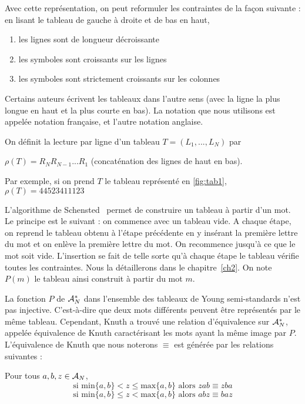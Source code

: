 \vspace*{2em}
Avec cette représentation, on peut reformuler les contraintes de la façon suivante : en lisant le tableau de gauche à droite et de bas en haut,
\vspace*{-1em}
\begin{enumerate}[parsep=0cm, itemsep=0cm]
	\item les lignes sont de longueur décroissante
	\item les symboles sont croissants sur les lignes
	\item les symboles sont strictement croissants sur les colonnes
\end{enumerate}

\begin{remark}
  Certains auteurs écrivent les tableaux dans l'autre sens (avec la ligne la plus longue en haut et la plus courte en bas). La notation que nous utilisons est appelée notation française, et l'autre notation anglaise.
\end{remark}

On définit la lecture par ligne d'un tableau $T=(L_1,...,L_N)$ par 
\begin{definition} \label{def:row_reading}
  $\rho(T)=R_NR_{N-1}...R_1$ (concaténation des lignes de haut en bas). 
\end{definition} \vspace*{-1em}
\noindent Par exemple, si on prend $T$ le tableau représenté en \ref{fig:tab1}, $\rho(T)=44523411123$

L'algorithme de Schensted~\cite{schensted1961longest} permet de construire un tableau à partir d'un mot. Le principe est le suivant : on commence avec un tableau vide. A chaque étape, on reprend le tableau obtenu à l'étape précédente en y insérant la première lettre du mot et on enlève la première lettre du mot. On recommence jusqu'à ce que le mot soit vide. L'insertion se fait de telle sorte qu'à chaque étape le tableau vérifie toutes les contraintes. Nous la détaillerons dans le chapitre~\ref{ch2}. On note $P(m)$ le tableau ainsi construit à partir du mot $m$.

La fonction $P$ de $\mathcal{A}_N^*$ dans l'ensemble des tableaux de Young semi-standards n'est pas injective. C'est-à-dire que deux mots différents peuvent être représentés par le même tableau. Cependant, Knuth \cite{knuth1970permutations} a trouvé une relation d'équivalence sur $\mathcal{A}_N^*$, appelée équivalence de Knuth caractérisant les mots ayant la même image par $P$. L'équivalence de Knuth que nous noterons $\equiv$ est générée par les relations suivantes : 
\begin{definition} \label{def:rel_knuth}
  Pour tous $a,b,z \in \mathcal{A}_N$, $$\text{si min}\{a,b\}<z\leq\text{max}\{a,b\}\text{ alors }zab \equiv zba$$ $$\text{si min}\{a,b\}\leq z<\text{max}\{a,b\}\text{ alors }abz \equiv baz$$
\end{definition}

